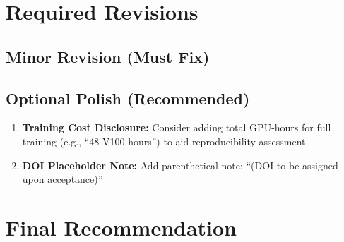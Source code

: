 \documentclass[12pt,a4paper]{article}
\begin{document}
\section{Required Revisions}

\subsection{Minor Revision (Must Fix)}

\begin{center}
\end{center}

\subsection{Optional Polish (Recommended)}

\begin{enumerate}
\item \textbf{Training Cost Disclosure:} Consider adding total GPU-hours for full training (e.g., ``48 V100-hours'') to aid reproducibility assessment
\item \textbf{DOI Placeholder Note:} Add parenthetical note: ``(DOI to be assigned upon acceptance)''
\end{enumerate}

\section{Final Recommendation}
\end{document}
